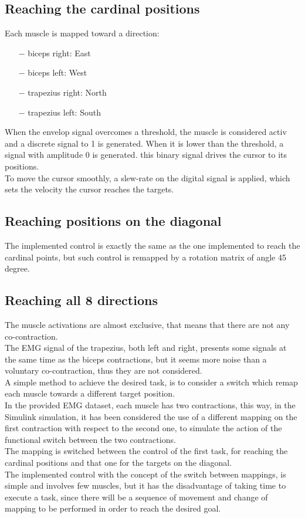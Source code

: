 \documentclass{article}
\begin{document}
	\subsection*{Reaching the cardinal positions}
	Each muscle is mapped toward a direction:
	\begin{itemize}
		\item[$-$] biceps right: East
		\item[$-$] biceps left: West
		\item[$-$] trapezius right: North
		\item[$-$] trapezius left: South
	\end{itemize}
	When the envelop signal overcomes a threshold, the muscle is considered activ and a discrete signal to 1 is generated. When it is lower than the threshold, a signal with amplitude 0 is generated. this binary signal drives the cursor to its positions.\\
	To move the cursor smoothly, a slew-rate on the digital signal is applied, which sets the velocity the cursor reaches the targets.
	
	\subsection*{Reaching positions on the diagonal}
	The implemented control is exactly the same as the one implemented to reach the cardinal points, but such control is remapped by a rotation matrix of angle 45 degree.
	
	\subsection*{Reaching all 8 directions}
	The muscle activations are almost exclusive, that means that there are not any co-contraction.\\
	The EMG signal of the trapezius, both left and right, presents some signals at the same time as the biceps contractions, but it seems more noise than a voluntary co-contraction, thus they are not considered.\\
	A simple method to achieve the desired task, is to consider a switch which remap each muscle towards a different target position.\\
	In the provided EMG dataset, each muscle has two contractions, this way, in the Simulink simulation, it has been considered the use of a different mapping on the first contraction with respect to the second one, to simulate the action of the functional switch between the two contractions.\\
	The mapping is switched between the control of the first task, for reaching the cardinal positions and that one for the targets on the diagonal.\\
	The implemented control with the concept of the switch between mappings, is simple and involves few muscles, but it has the disadvantage of taking time to execute a task, since there will be a sequence of movement and change of mapping to be performed in order to reach the desired goal.
	
\end{document}
